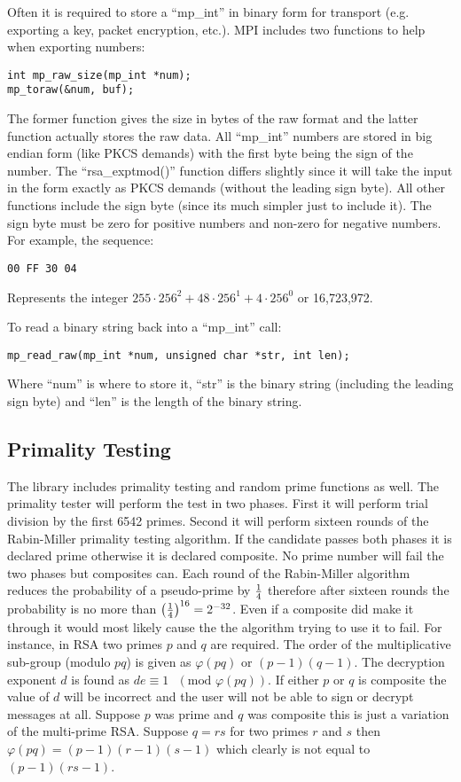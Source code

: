 \documentclass{book}
\def\phi{\varphi}
\begin{document}
Often it is required to store a ``mp\_int'' in binary form for transport (e.g. exporting a key, packet encryption, etc.).
MPI includes two functions to help when exporting numbers:
\begin{verbatim}
int mp_raw_size(mp_int *num);
mp_toraw(&num, buf);
\end{verbatim}

The former function gives the size in bytes of the raw format and the latter function actually stores the raw data.  All
``mp\_int'' numbers are stored in big endian form (like PKCS demands) with the first byte being the sign of the number.  The
``rsa\_exptmod()'' function differs slightly since it will take the input in the form exactly as PKCS demands (without the
leading sign byte).  All other functions include the sign byte (since its much simpler just to include it).  The sign byte
must be zero for positive numbers and non-zero for negative numbers.  For example,
the sequence:
\begin{verbatim}
00 FF 30 04
\end{verbatim}
Represents the integer $255 \cdot 256^2 + 48 \cdot 256^1 + 4 \cdot 256^0$ or 16,723,972.

To read a binary string back into a ``mp\_int'' call:
\begin{verbatim}
mp_read_raw(mp_int *num, unsigned char *str, int len);
\end{verbatim}
Where ``num'' is where to store it, ``str'' is the binary string (including the leading sign byte) and ``len'' is the 
length of the binary string.

\subsection{Primality Testing}
The library includes primality testing and random prime functions as well.  The primality tester will perform the test in
two phases.  First it will perform trial division by the first 6542 primes.  Second it will perform sixteen rounds of the 
Rabin-Miller primality testing algorithm.  If the candidate passes both phases it is declared prime otherwise it is declared
composite.  No prime number will fail the two phases but composites can.  Each round of the Rabin-Miller algorithm reduces
the probability of a pseudo-prime by $1 \over 4$ therefore after sixteen rounds the probability is no more than 
$\left ( { 1 \over 4 } \right )^{16} = 2^{-32}$.  Even if a composite did make it through it would most likely cause the 
the algorithm trying to use it to fail.  For instance, in RSA two primes $p$ and $q$ are required.  The order of the 
multiplicative sub-group (modulo $pq$) is given as $\phi(pq)$ or $(p - 1)(q - 1)$.  The decryption exponent $d$ is found
as $de \equiv 1\mbox{ }(\mbox{mod } \phi(pq))$.  If either $p$ or $q$ is composite the value of $d$ will be incorrect and the user
will not be able to sign or decrypt messages at all.  Suppose $p$ was prime and $q$ was composite this is just a variation of 
the multi-prime RSA.  Suppose $q = rs$ for two primes $r$ and $s$ then $\phi(pq) = (p - 1)(r - 1)(s - 1)$ which clearly is 
not equal to $(p - 1)(rs - 1)$.
\end{document}
